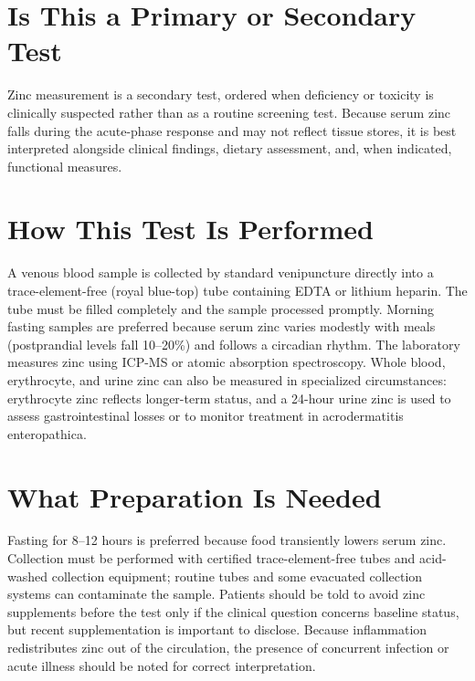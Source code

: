 \section*{Is This a Primary or Secondary Test}
Zinc measurement is a secondary test, ordered when deficiency or toxicity is clinically suspected rather than as a routine screening test. Because serum zinc falls during the acute-phase response and may not reflect tissue stores, it is best interpreted alongside clinical findings, dietary assessment, and, when indicated, functional measures.

\section*{How This Test Is Performed}
A venous blood sample is collected by standard venipuncture directly into a trace-element-free (royal blue-top) tube containing EDTA or lithium heparin. The tube must be filled completely and the sample processed promptly. Morning fasting samples are preferred because serum zinc varies modestly with meals (postprandial levels fall 10--20\%) and follows a circadian rhythm. The laboratory measures zinc using ICP-MS or atomic absorption spectroscopy. Whole blood, erythrocyte, and urine zinc can also be measured in specialized circumstances: erythrocyte zinc reflects longer-term status, and a 24-hour urine zinc is used to assess gastrointestinal losses or to monitor treatment in acrodermatitis enteropathica.

\section*{What Preparation Is Needed}
Fasting for 8--12 hours is preferred because food transiently lowers serum zinc. Collection must be performed with certified trace-element-free tubes and acid-washed collection equipment; routine tubes and some evacuated collection systems can contaminate the sample. Patients should be told to avoid zinc supplements before the test only if the clinical question concerns baseline status, but recent supplementation is important to disclose. Because inflammation redistributes zinc out of the circulation, the presence of concurrent infection or acute illness should be noted for correct interpretation.

